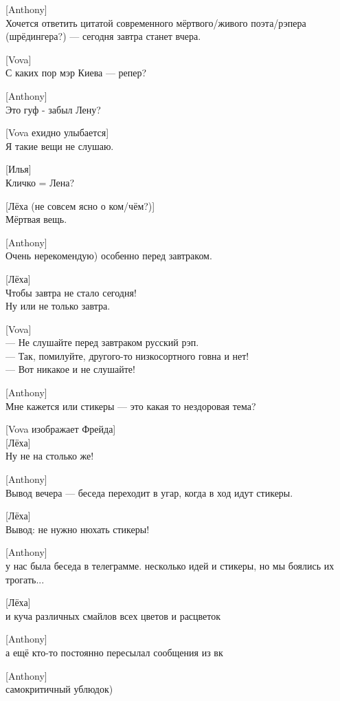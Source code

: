 [Anthony]\\
Хочется ответить цитатой современного мёртвого/живого поэта/рэпера (шрёдингера?) --- сегодня завтра станет вчера.


[Vova]\\
С каких пор мэр Киева — репер?


[Anthony]\\
Это гуф - забыл Лену?


[Vova ехидно улыбается]\\
Я такие вещи не слушаю.


[Илья]\\
Кличко = Лена?


[Лёха (не совсем ясно о ком/чём?)]\\
Мёртвая вещь.


[Anthony]\\
Очень нерекомендую) особенно перед завтраком.


[Лёха]\\
Чтобы завтра не стало сегодня!\\
Ну или не только завтра.


[Vova]\\
— Не слушайте перед завтраком русский рэп.\\
— Так, помилуйте, другого-то низкосортного говна и нет!\\
— Вот никакое и не слушайте!


[Anthony]\\
Мне кажется или стикеры --- это какая то нездоровая тема?


[Vova изображает Фрейда]\\


[Лёха]\\
Ну не на столько же!


[Anthony]\\
Вывод вечера --- беседа переходит в угар, когда в ход идут стикеры.


[Лёха]\\
Вывод: не нужно нюхать стикеры!


[Anthony]\\
у нас была беседа в телеграмме. несколько идей и стикеры, но мы боялись их трогать...


[Лёха]\\
и куча различных смайлов всех цветов и расцветок


[Anthony]\\
а ещё кто-то постоянно пересылал сообщения из вк


[Anthony]\\
самокритичный ублюдок)


